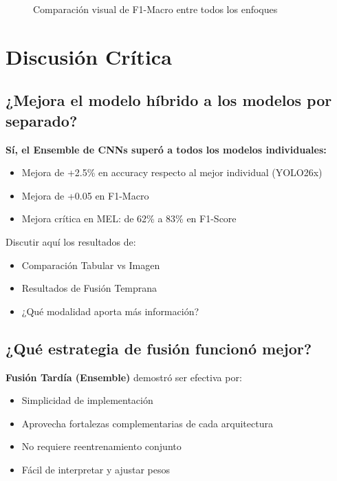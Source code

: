 \documentclass[12pt,a4paper]{article}
\begin{document}
\begin{figure}[H]
\centering
{}
\caption{Comparación visual de F1-Macro entre todos los enfoques}
\label{fig:comparacion_barras}
\end{figure}

\newpage

\section{Discusión Crítica}

\subsection{¿Mejora el modelo híbrido a los modelos por separado?}

\textbf{Sí, el Ensemble de CNNs superó a todos los modelos individuales:}
\begin{itemize}
    \item Mejora de +2.5\% en accuracy respecto al mejor individual (YOLO26x)
    \item Mejora de +0.05 en F1-Macro
    \item Mejora crítica en MEL: de 62\% a 83\% en F1-Score
\end{itemize}

\begin{pendiente}
Discutir aquí los resultados de:
\begin{itemize}
    \item Comparación Tabular vs Imagen
    \item Resultados de Fusión Temprana
    \item ¿Qué modalidad aporta más información?
\end{itemize}
\end{pendiente}

\subsection{¿Qué estrategia de fusión funcionó mejor?}

\textbf{Fusión Tardía (Ensemble)} demostró ser efectiva por:
\begin{itemize}
    \item Simplicidad de implementación
    \item Aprovecha fortalezas complementarias de cada arquitectura
    \item No requiere reentrenamiento conjunto
    \item Fácil de interpretar y ajustar pesos
\end{itemize}
\end{document}
